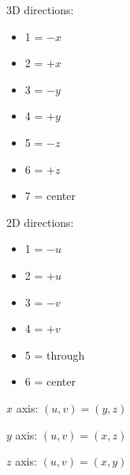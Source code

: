 \documentclass{article}
\begin{document}
3D directions:
\begin{itemize}
\item 1 = \(-x\) 
\item 2 = \(+x\) 
\item 3 = \(-y\) 
\item 4 = \(+y\) 
\item 5 = \(-z\) 
\item 6 = \(+z\) 
\item 7 = center
\end{itemize}

2D directions: 
\begin{itemize}
\item 1 = \(-u\) 
\item 2 = \(+u\) 
\item 3 = \(-v\) 
\item 4 = \(+v\) 
\item 5 = through
\item 6 = center
\end{itemize}


\(x\) axis: \((u, v) = (y, z)\) 

\(y\) axis: \((u, v) = (x, z)\) 

\(z\) axis: \((u, v) = (x, y)\) 
\end{document}
